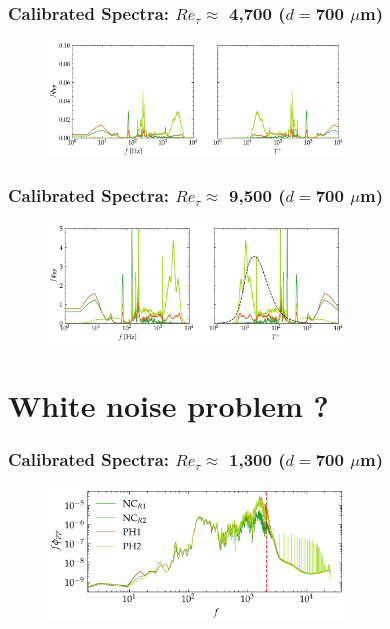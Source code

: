 \documentclass[aspectratio=169,9pt]{beamer}
\begin{document}
\begin{frame}
  \frametitle{Calibrated Spectra: $Re_\tau \approx$ 4,700 ($d=$700 $\mu$m)}
  \begin{figure}
    \centering
    \includegraphics[width=0.7\textwidth]{tf_corrected_spectra/700_50psi_tf_fused_insitu_spec_close.png}
  \end{figure}
\end{frame}

\begin{frame}
  \frametitle{Calibrated Spectra: $Re_\tau \approx$ 9,500 ($d=$700 $\mu$m)}
  \begin{figure}
    \centering
    \includegraphics[width=0.7\textwidth]{tf_corrected_spectra/700_100psi_tf_fused_insitu_spec_close.png}
  \end{figure}
\end{frame}

\section{White noise problem ?}

\begin{frame}
  \frametitle{Calibrated Spectra: $Re_\tau \approx$ 1,300 ($d=$700 $\mu$m)}
  \begin{figure}
    \centering
    \includegraphics[width=0.7\textwidth]{tf_calib/700_atm_calib_spec_a2.png}
  \end{figure}
\end{frame}
\end{document}
